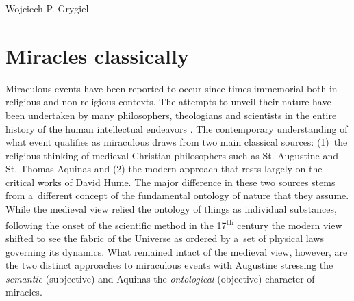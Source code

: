 \begin{artengenv}{Wojciech P. Grygiel}
\section*{Miracles classically}
Miraculous events have been reported to occur since times immemorial both in religious and non-religious contexts. The attempts to unveil their nature have been undertaken by many philosophers, theologians and scientists in the entire history of the human intellectual endeavors
\parencite[e.g.][]{basinger_miracles_2018}. %
 The contemporary understanding of what event qualifies as miraculous draws from two main classical sources: (1)~the religious thinking of medieval Christian philosophers such as St. Augustine and St. Thomas Aquinas and (2) the modern approach that rests largely on the critical works of David Hume. The major difference in these two sources stems from a~different concept of the fundamental ontology of nature that they assume. While the medieval view relied the ontology of things as individual substances, following the onset of the scientific method in the 17\textsuperscript{th} century the modern view shifted to see the fabric of the Universe as ordered by a~set of physical laws governing its dynamics. What remained intact of the medieval view, however, are the two distinct approaches to miraculous events with Augustine stressing the \textit{semantic} (subjective) and Aquinas the \textit{ontological} (objective) character of miracles.


\end{artengenv}

